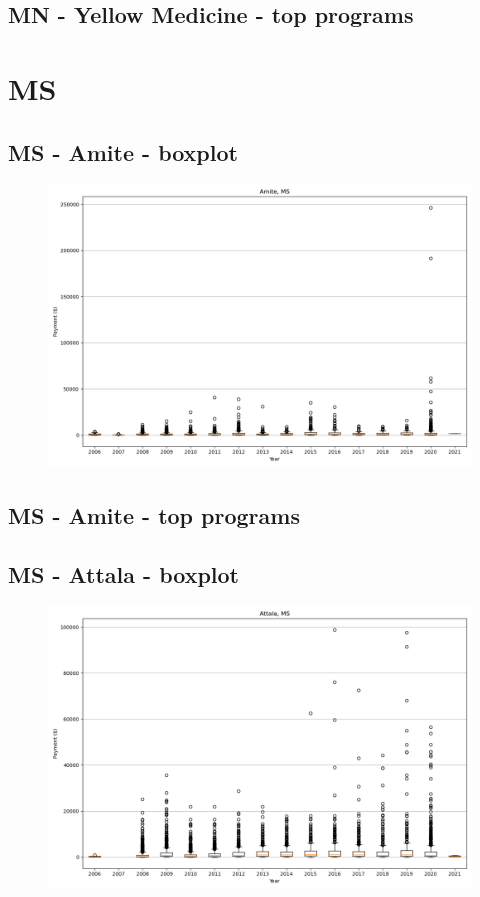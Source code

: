 \subsection*{MN - Yellow Medicine - top programs}

\newpage
\section*{MS}
\subsection*{MS - Amite - boxplot}
\begin{figure}[h]
\centering
\includegraphics[width=7in]{../output/boxplots/counties/Amite-MS_boxplot.png}
\end{figure}


\subsection*{MS - Amite - top programs}

\newpage
\subsection*{MS - Attala - boxplot}
\begin{figure}[h]
\centering
\includegraphics[width=7in]{../output/boxplots/counties/Attala-MS_boxplot.png}
\end{figure}


